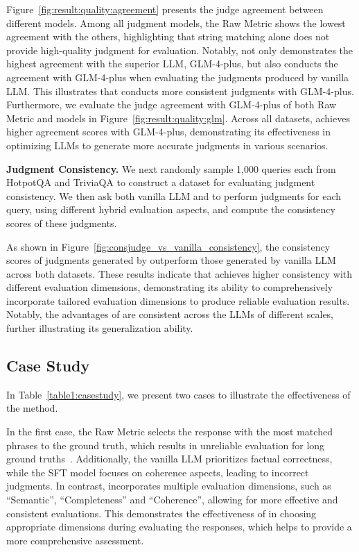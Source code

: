 Figure~\ref{fig:result:quality:agreement} presents the judge agreement between different models. Among all judgment models, the Raw Metric shows the lowest agreement with the others, highlighting that string matching alone does not provide high-quality judgment for evaluation. Notably, \method{} not only demonstrates the highest agreement with the superior LLM, GLM-4-plus, but also conducts the agreement with GLM-4-plus when evaluating the judgments produced by vanilla LLM. This illustrates that \method{} conducts more consistent judgments with GLM-4-plus. Furthermore, we evaluate the judge agreement with GLM-4-plus of both Raw Metric and \method{} models in Figure~\ref{fig:result:quality:glm}. Across all datasets, \method{} achieves higher agreement scores with GLM-4-plus, demonstrating its effectiveness in optimizing LLMs to generate more accurate judgments in various scenarios.

\textbf{Judgment Consistency.} We next randomly sample 1,000 queries each from HotpotQA and TriviaQA to construct a dataset for evaluating judgment consistency. We then ask both vanilla LLM and \method{} to perform judgments for each query, using different hybrid evaluation aspects, and compute the consistency scores of these judgments.

As shown in Figure~\ref{fig:consjudge_vs_vanilla_consistency}, the consistency scores of judgments generated by \method{} outperform those generated by vanilla LLM across both datasets. These results indicate that \method{} achieves higher consistency with different evaluation dimensions, demonstrating its ability to comprehensively incorporate tailored evaluation dimensions to produce reliable evaluation results. Notably, the advantages of \method{} are consistent across the LLMs of different scales, further illustrating its generalization ability.




\subsection{Case Study}
\label{sec:5.4}
In Table~\ref{table1:casestudy}, we present two cases to illustrate the effectiveness of the \method{} method.

In the first case, the Raw Metric selects the response with the most matched phrases to the ground truth, which results in unreliable evaluation for long ground truths~\cite{EnablingLargeLanguageModelstoGenerateTextwithCitations2023GaoTianyu}. Additionally, the vanilla LLM prioritizes factual correctness, while the SFT model focuses on coherence aspects, leading to incorrect judgments. In contrast, \method{} incorporates multiple evaluation dimensions, such as ``Semantic'', ``Completeness'' and ``Coherence'', allowing for more effective and consistent evaluations. This demonstrates the effectiveness of \method{} in choosing appropriate dimensions during evaluating the responses, which helps to provide a more comprehensive assessment.

